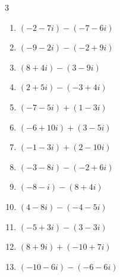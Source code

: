 \begin{multicols}{3}
\begin{enumerate}
  \item $\displaystyle (-2-7i) - (-7-6i)$

        \phantom{$\displaystyle =5-i$}

  \item $\displaystyle (-9-2i) - (-2+9i)$

        \phantom{$\displaystyle =-7-11i$}

  \item $\displaystyle (8+4i) - (3-9i)$

        \phantom{$\displaystyle =5+13i$}

  \item $\displaystyle (2+5i) - (-3+4i)$

        \phantom{$\displaystyle =5+i$}

  \item $\displaystyle (-7-5i) + (1-3i)$

        \phantom{$\displaystyle =-6-8i$}

  \item $\displaystyle (-6+10i) + (3-5i)$

        \phantom{$\displaystyle =-3+5i$}

  \item $\displaystyle (-1-3i) + (2-10i)$

        \phantom{$\displaystyle =1-13i$}

  \item $\displaystyle (-3-8i) - (-2+6i)$

        \phantom{$\displaystyle =-1-14i$}

  \item $\displaystyle (-8-i) - (8+4i)$

        \phantom{$\displaystyle =-16-5i$}

  \item $\displaystyle (4-8i) - (-4-5i)$

        \phantom{$\displaystyle =8-3i$}

  \item $\displaystyle (-5+3i) - (3-3i)$

        \phantom{$\displaystyle =-8+6i$}

  \item $\displaystyle (8+9i) + (-10+7i)$

        \phantom{$\displaystyle =-2+16i$}

  \item $\displaystyle (-10-6i) - (-6-6i)$

        \phantom{$\displaystyle =-4$}


\end{enumerate}
\end{multicols}
